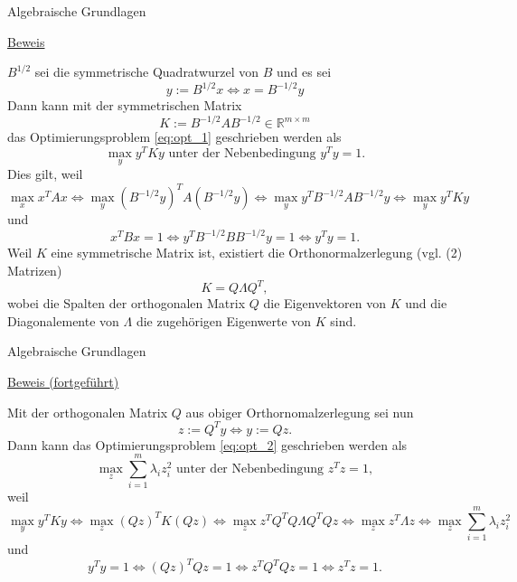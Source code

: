 \documentclass[
  8pt,
  ignorenonframetext,
]{beamer}
\begin{document}
\begin{frame}{Algebraische Grundlagen}
\protect\hypertarget{algebraische-grundlagen-4}{}
\footnotesize

\underline{Beweis}

\(B^{1/2}\) sei die symmetrische Quadratwurzel von \(B\) und es sei
\begin{equation}
y := B^{1/2}x \Leftrightarrow x = B^{-1/2}y
\end{equation} Dann kann mit der symmetrischen Matrix \begin{equation}
K := B^{-1/2}AB^{-1/2} \in \mathbb{R}^{m \times m}
\end{equation} das Optimierungsproblem \eqref{eq:opt_1} geschrieben
werden als \begin{equation}\label{eq:opt_2}
\max_{y} y^T K y
\mbox{ unter der Nebenbedingung }
y^Ty = 1.
\end{equation} Dies gilt, weil \begin{equation}
\max_{x} x^TAx
\Leftrightarrow
\max_{y} \left(B^{-1/2}y\right)^TA\left(B^{-1/2}y\right)
\Leftrightarrow
\max_{y} y^TB^{-1/2}AB^{-1/2}y
\Leftrightarrow
\max_{y} y^TKy
\end{equation} und \begin{equation}
x^TBx = 1
\Leftrightarrow y^T B^{-1/2}BB^{-1/2}y = 1
\Leftrightarrow y^Ty = 1.
\end{equation} Weil \(K\) eine symmetrische Matrix ist, existiert die
Orthonormalzerlegung (vgl. (2) Matrizen) \begin{equation}
K = Q\Lambda Q^T,
\end{equation} wobei die Spalten der orthogonalen Matrix \(Q\) die
Eigenvektoren von \(K\) und die Diagonalemente von \(\Lambda\) die
zugehörigen Eigenwerte von \(K\) sind.
\end{frame}

\begin{frame}{Algebraische Grundlagen}
\protect\hypertarget{algebraische-grundlagen-5}{}
\footnotesize

\underline{Beweis (fortgeführt)}

Mit der orthogonalen Matrix \(Q\) aus obiger Orthornomalzerlegung sei
nun \begin{equation}
z := Q^Ty \Leftrightarrow y := Qz.
\end{equation} Dann kann das Optimierungsproblem \eqref{eq:opt_2}
geschrieben werden als \begin{equation}\label{eq:opt_3}
\max_{z} \sum_{i = 1}^m \lambda_i z_i^2 \mbox{ unter der Nebenbedingung } z^Tz = 1,
\end{equation} weil \begin{equation}
\max_{y} y^TKy
\Leftrightarrow
\max_{z} (Qz)^TK(Qz)
\Leftrightarrow
\max_{z} z^TQ^TQ\Lambda Q^TQz
\Leftrightarrow
\max_{z} z^T\Lambda z
\Leftrightarrow
\max_{z} \sum_{i=1}^m \lambda_i z_i^2
\end{equation} und \begin{equation}
y^Ty = 1
\Leftrightarrow
(Qz)^T Qz = 1
\Leftrightarrow
z^T Q^TQz = 1
\Leftrightarrow
z^T z = 1.
\end{equation}
\end{frame}
\end{document}
